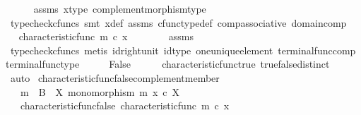 \begin{isabellebody}
\ \ \ \ \isamarkupfalse%
\ assms\ x{\isacharprime}{\kern0pt}{\isacharunderscore}{\kern0pt}type\ complement{\isacharunderscore}{\kern0pt}morphism{\isacharunderscore}{\kern0pt}type\isanewline
\ \ \ \ \isamarkupfalse%
\ {\isacharparenleft}{\kern0pt}typecheck{\isacharunderscore}{\kern0pt}cfuncs{\isacharcomma}{\kern0pt}\ smt\ x{\isacharprime}{\kern0pt}{\isacharunderscore}{\kern0pt}def\ assms\ cfunc{\isacharunderscore}{\kern0pt}type{\isacharunderscore}{\kern0pt}def\ comp{\isacharunderscore}{\kern0pt}associative\ domain{\isacharunderscore}{\kern0pt}comp{\isacharparenright}{\kern0pt}\isanewline
\ \ \isamarkupfalse%
\ \isamarkupfalse%
\ {\isachardoublequoteopen}characteristic{\isacharunderscore}{\kern0pt}func\ m\ {\isasymcirc}\isactrlsub c\ x\ {\isacharequal}{\kern0pt}\ {\isasymf}{\isachardoublequoteclose}\isanewline
\ \ \ \ \isamarkupfalse%
\ assms\ \isamarkupfalse%
\ {\isacharparenleft}{\kern0pt}typecheck{\isacharunderscore}{\kern0pt}cfuncs{\isacharcomma}{\kern0pt}\ metis\ id{\isacharunderscore}{\kern0pt}right{\isacharunderscore}{\kern0pt}unit{}\ id{\isacharunderscore}{\kern0pt}type\ one{\isacharunderscore}{\kern0pt}unique{\isacharunderscore}{\kern0pt}element\ terminal{\isacharunderscore}{\kern0pt}func{\isacharunderscore}{\kern0pt}comp\ terminal{\isacharunderscore}{\kern0pt}func{\isacharunderscore}{\kern0pt}type{\isacharparenright}{\kern0pt}\isanewline
\ \ \isamarkupfalse%
\ \isamarkupfalse%
\ False\isanewline
\ \ \ \ \isamarkupfalse%
\ characteristic{\isacharunderscore}{\kern0pt}func{\isacharunderscore}{\kern0pt}true\ true{\isacharunderscore}{\kern0pt}false{\isacharunderscore}{\kern0pt}distinct\ \isamarkupfalse%
\ auto\isanewline
{}\isamarkupfalse%
%
\endisatagproof
{\isafoldproof}%
%
\isadelimproof
\isanewline
%
\endisadelimproof
\isanewline
{}\isamarkupfalse%
\ characteristic{\isacharunderscore}{\kern0pt}func{\isacharunderscore}{\kern0pt}false{\isacharunderscore}{\kern0pt}complement{\isacharunderscore}{\kern0pt}member{\isacharcolon}{\kern0pt}\isanewline
\ \ \ {\isachardoublequoteopen}m\ {\isacharcolon}{\kern0pt}\ B\ {\isasymrightarrow}\ X{\isachardoublequoteclose}\ {\isachardoublequoteopen}monomorphism\ m{\isachardoublequoteclose}\ {\isachardoublequoteopen}x\ {\isasymin}\isactrlsub c\ X{\isachardoublequoteclose}\isanewline
\ \ \ characteristic{\isacharunderscore}{\kern0pt}func{\isacharunderscore}{\kern0pt}false{\isacharcolon}{\kern0pt}\ {\isachardoublequoteopen}characteristic{\isacharunderscore}{\kern0pt}func\ m\ {\isasymcirc}\isactrlsub c\ x\ {\isacharequal}{\kern0pt}\ {\isasymf}{\isachardoublequoteclose}\isanewline

\end{isabellebody}

